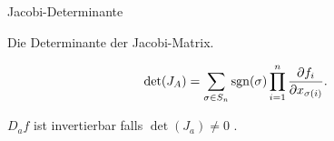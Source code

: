\documentclass[class=article, crop=false]{standalone}
\begin{document}
\begin{zettel}{Jacobi-Determinante}
\begin{flashcard}[]{}
	\begin{definition}
		Die Determinante der Jacobi-Matrix.
	\end{definition}
	\[
		\det(J_A) = \sum_{\sigma \in  S_n } \operatorname{sgn}(\sigma) \prod_{i = 1}^{n} \frac{\partial f_i}{\partial x_{\sigma(i)}}
	.\]
\end{flashcard}
\begin{remark}
	$D_a f$ ist invertierbar falls $\det(J_a) \neq 0$ .
\end{remark}
\end{zettel}
\end{document}
